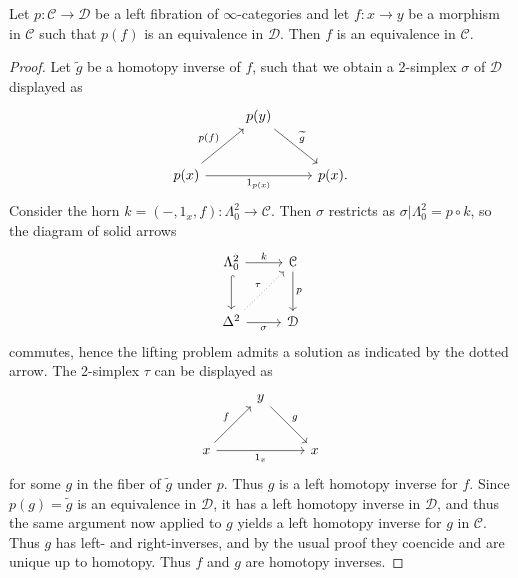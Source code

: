 \begin{proposition}\label{2.1.1.7}
	Let $p : \mathcal{C}  \to \mathcal{D} $ be a left fibration of $\infty $-categories and let $f : x \to y$ be a morphism in $\mathcal{C} $ such that $p(f)$ is an equivalence in $\mathcal{D} $. Then $f$ is an equivalence in $\mathcal{C} $.
\end{proposition}
\begin{proof}
	Let $\widetilde{g} $ be a homotopy inverse of $f$, such that we obtain a 2-simplex $\sigma $ of $\mathcal{D} $ displayed as
	\[\begin{tikzcd}[row sep = 2.5em, column sep = 2.5em]
	 & p(y)\ar[" \widetilde{g}  ", dr]  &  \\
	p(x)\ar[" p(f) ", ur] \ar[" 1_{p(x)}  "', rr]  &  & p(x).
	\end{tikzcd}\]
	Consider the horn $k = (-,1_{x},f): \Lambda_0^2 \to \mathcal{C} $. Then $\sigma $ restricts as $\sigma |\Lambda_0^2 = p\circ k$, so the diagram of solid arrows
	\[\begin{tikzcd}[row sep = 2.5em, column sep = 2.5em]
	\Lambda _0^2 \ar[" k ", r] \ar[hook, d]  & \mathcal{C} \ar[" p ", d]  \\
	\Delta ^2 \ar[" \sigma  "', r]  \ar[dotted, " \tau  ", ur] & \mathcal{D} 
	\end{tikzcd}\]
	commutes, hence the lifting problem admits a solution as indicated by the dotted arrow. The 2-simplex $\tau $ can be displayed as
	\[\begin{tikzcd}[row sep = 2.5em, column sep = 2.5em]
	 & y \ar[" g ", dr] &  \\
		x \ar[" 1_x "', rr] \ar[" f ", ur]  & & x
	\end{tikzcd}\]
	for some $g$ in the fiber of $\widetilde{g} $ under $p$. Thus $g$ is a left homotopy inverse for $f$. Since $p(g)=\widetilde{g} $ is an equivalence in $\mathcal{D} $, it has a left homotopy inverse in $\mathcal{D} $, and thus the same argument now applied to $g$ yields a left homotopy inverse for $g$ in $\mathcal{C} $. Thus $g$ has left- and right-inverses, and by the usual proof they coencide and are unique up to homotopy. Thus $f$ and $g$ are homotopy inverses.
\end{proof}

